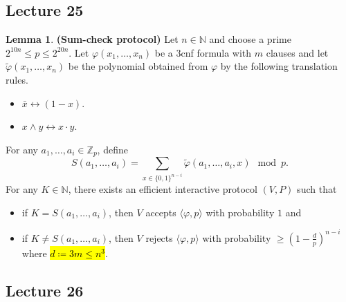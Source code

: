 \documentclass[10pt,letterpaper,cm]{nupset}
\theoremstyle{definition}
\newtheorem{lemma}{Lemma}
\newcommand{\N}{\mathbb N}
\newcommand{\Z}{\mathbb Z}
\newcommand{\1}{\mathbf{1}}
\newcommand{\0}{\vec 0}
\begin{document}
\subsection{Lecture 25}

\begin{lemma}{\textbf{(Sum-check protocol)}}
Let $n\in \N$ and choose a prime $2^{10n}\leq p\leq 2^{20n}$. Let  $\varphi(x_1, \ldots, x_n)$ be a 3cnf formula with $m$ clauses and let $\tilde{\varphi}(x_1, \ldots, x_n)$ be the polynomial obtained from $\varphi$ by the following translation rules.
\begin{itemize}
\item $\bar{x} \longleftrightarrow (1-x)$.
\item $x \land y \longleftrightarrow x \cdot y$.
\end{itemize} 
For any $a_1, \ldots, a_i \in \Z_p$, define $$S(a_1, \ldots, a_i) = \sum_{x\in \{0,1\}^{n-i}} \tilde{\varphi}(a_1, \ldots, a_i, x) \mod p.$$ For any $K\in \N$, there exists an efficient interactive protocol $(V, P)$ such that 
\begin{itemize}
\item if $K =S(a_1, \ldots, a_i)$, then $V$ accepts $\langle \varphi, p \rangle$ with probability $1$ and
\item if $K \ne S(a_1, \ldots, a_i)$, then $V$ rejects $\langle \varphi, p \rangle$ with probability $\geq (1-\frac{d}{p})^{n-i}$ where \hl{$d \coloneqq 3m\leq n^3$}.
\end{itemize}
\end{lemma}


\subsection{Lecture 26}
\end{document}
